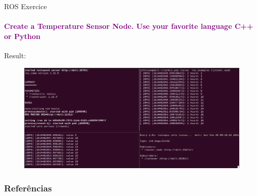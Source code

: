 \documentclass[aspectratio=169]{beamer}
\begin{document}
\begin{frame}{ROS Exercice}
	\framesubtitle{\textcolor{purple}{Create a Temperature Sensor Node. Use your favorite language C++ or Python}}
	Result:
	\begin{figure}
		\includegraphics[width=1\textwidth]{./images/ros_sensor_example.png}
	\end{figure}
\end{frame}


\begin{frame}[t, allowframebreaks]
	\frametitle{Referências}
	
\end{frame}
\end{document}
